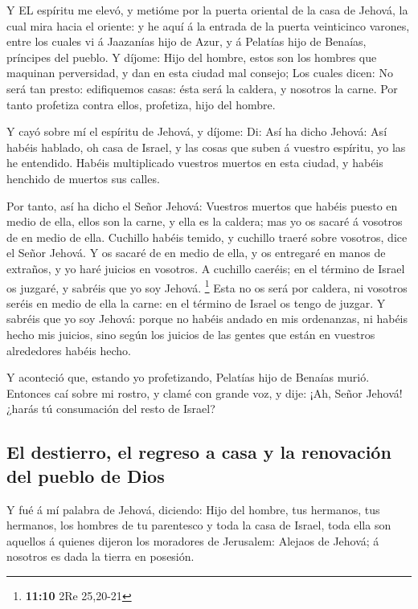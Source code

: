  Y EL espíritu me elevó, y metióme por la puerta oriental de
la casa de Jehová, la cual mira hacia el oriente: y he aquí á la entrada
de la puerta veinticinco varones, entre los cuales vi á Jaazanías hijo
de Azur, y á Pelatías hijo de Benaías, príncipes del pueblo.
 Y díjome: Hijo del hombre, estos son los hombres que
maquinan perversidad, y dan en esta ciudad mal consejo;  Los
cuales dicen: No será tan presto: edifiquemos casas: ésta será la
caldera, y nosotros la carne.  Por tanto profetiza contra
ellos, profetiza, hijo del hombre.

 Y cayó sobre mí el espíritu de Jehová, y díjome: Di: Así ha
dicho Jehová: Así habéis hablado, oh casa de Israel, y las cosas que
suben á vuestro espíritu, yo las he entendido.  Habéis
multiplicado vuestros muertos en esta ciudad, y habéis henchido de
muertos sus calles.

 Por tanto, así ha dicho el Señor Jehová: Vuestros muertos
que habéis puesto en medio de ella, ellos son la carne, y ella es la
caldera; mas yo os sacaré á vosotros de en medio de ella. 
Cuchillo habéis temido, y cuchillo traeré sobre vosotros, dice el Señor
Jehová.  Y os sacaré de en medio de ella, y os entregaré en
manos de extraños, y yo haré juicios en vosotros.  A
cuchillo caeréis; en el término de Israel os juzgaré, y sabréis que yo
soy Jehová. \footnote{\textbf{11:10} 2Re 25,20-21}  Esta no
os será por caldera, ni vosotros seréis en medio de ella la carne: en el
término de Israel os tengo de juzgar.  Y sabréis que yo soy
Jehová: porque no habéis andado en mis ordenanzas, ni habéis hecho mis
juicios, sino según los juicios de las gentes que están en vuestros
alrededores habéis hecho.

 Y aconteció que, estando yo profetizando, Pelatías hijo de
Benaías murió. Entonces caí sobre mi rostro, y clamé con grande voz, y
dije: ¡Ah, Señor Jehová! ¿harás tú consumación del resto de Israel?

\hypertarget{el-destierro-el-regreso-a-casa-y-la-renovaciuxf3n-del-pueblo-de-dios}{%
\subsection{El destierro, el regreso a casa y la renovación del pueblo
de
Dios}\label{el-destierro-el-regreso-a-casa-y-la-renovaciuxf3n-del-pueblo-de-dios}}

 Y fué á mí palabra de Jehová, diciendo:  Hijo
del hombre, tus hermanos, tus hermanos, los hombres de tu parentesco y
toda la casa de Israel, toda ella son aquellos á quienes dijeron los
moradores de Jerusalem: Alejaos de Jehová; á nosotros es dada la tierra
en posesión.

